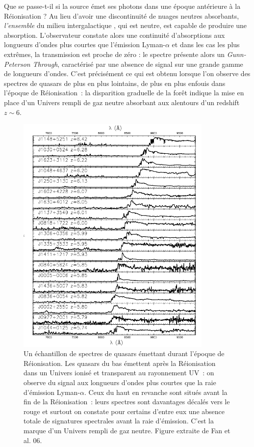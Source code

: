 Que se passe-t-il si la source émet ses photons dans une époque antérieure à la Réionisation ? Au lieu d'avoir une discontinuité de nuages neutres absorbants, \textit{l'ensemble} du milieu intergalactique , qui est neutre, est capable de produire une absorption. L'observateur constate alors une continuité d'absorptions aux longueurs d'ondes plus courtes que l'émission Lyman-$\alpha$ et dans les cas les plus extrêmes, la transmission est proche de zéro : le spectre présente alors un \textit{Gunn-Peterson Through}, caractérisé par une absence de signal sur une grande gamme de longueurs d'ondes. C'est précisément ce qui est obtenu lorsque l'on observe des spectres de quasars de plus en plus lointains, de plus en plus enfouis dans l'époque de Réionisation~: la disparition graduelle de la forêt indique la mise en place d'un Univers rempli de gaz neutre absorbant aux alentours d'un redshift $z\sim 6$.
\begin{figure}[htbp]
	\centering
		\includegraphics[height=12cm]{figs/fan06.png}
		\caption[Spectres de quasars durant la Réionisation]{Un échantillon de spectres de quasars émettant durant l'époque de Réionisation. Les quasars du bas émettent après la Réionisation dans un Univers ionisé et transparent au rayonnement UV~: on observe du signal aux longueurs d'ondes plus courtes que la raie d'émission Lyman-$\alpha$. Ceux du haut en revanche sont situés avant la fin de la Réionisation~: leurs spectres sont davantages décalés vers le rouge et surtout on constate pour certains d'entre eux une absence totale de signatures spectrales avant la raie d'émission. C'est la marque d'un Univers rempli de gaz neutre. Figure extraite de Fan et al. 06.}
	\label{f:fan06}
\end{figure}

